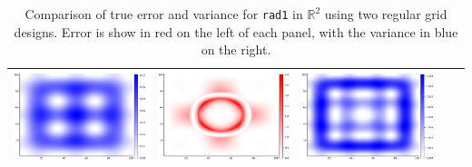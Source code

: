 \documentclass{article}
\newcommand{\R}{\mathbb{R}}
\numberwithin{equation}{section}
\begin{document}
\begin{table}
\begin{tabularx}{\textwidth}{| X | p{} p{} || p{} p{} |}
      \parbox[c]{.18\textwidth}{\includegraphics[scale=0.2]{figures/heatmaps/variance-noisy-16.png}} &
      \parbox[c]{.18\textwidth}{\includegraphics[scale=0.2]{figures/heatmaps/error-noisy-25.png}} &
      \parbox[c]{.18\textwidth}{\includegraphics[scale=0.2]{figures/heatmaps/variance-noisy-25.png}} \\
    \hline
  \end{tabularx}
  \caption{Comparison of true error and variance for \texttt{rad1} in $\R^2$ using two regular grid designs. Error is show in red on the left of each panel, with the variance in blue on the right.}
  \label{variance}
\end{table}
\end{document}
